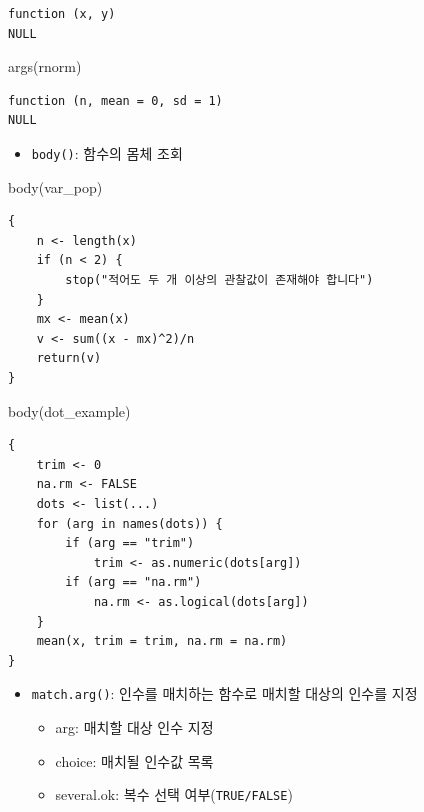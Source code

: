 \documentclass[
  11pt,
]{krantz}
\newenvironment{Shaded}{\begin{snugshade}}{\end{snugshade}}
\newcommand{\FunctionTok}[1]{\textcolor[rgb]{0,0,0}{#1}}
\newcommand{\NormalTok}[1]{#1}
\providecommand{\tightlist}{%
  \setlength{\itemsep}{0pt}\setlength{\parskip}{0pt}}
\begin{document}
\begin{verbatim}
function (x, y) 
NULL
\end{verbatim}

\begin{Shaded}
\begin{Highlighting}[]
\FunctionTok{args}\NormalTok{(rnorm)}
\end{Highlighting}
\end{Shaded}

\begin{verbatim}
function (n, mean = 0, sd = 1) 
NULL
\end{verbatim}

\normalsize

\begin{itemize}
\tightlist
\item
  \texttt{body()}: 함수의 몸체 조회
\end{itemize}

\footnotesize

\begin{Shaded}
\begin{Highlighting}[]
\FunctionTok{body}\NormalTok{(var\_pop)}
\end{Highlighting}
\end{Shaded}

\begin{verbatim}
{
    n <- length(x)
    if (n < 2) {
        stop("적어도 두 개 이상의 관찰값이 존재해야 합니다")
    }
    mx <- mean(x)
    v <- sum((x - mx)^2)/n
    return(v)
}
\end{verbatim}

\begin{Shaded}
\begin{Highlighting}[]
\FunctionTok{body}\NormalTok{(dot\_example)}
\end{Highlighting}
\end{Shaded}

\begin{verbatim}
{
    trim <- 0
    na.rm <- FALSE
    dots <- list(...)
    for (arg in names(dots)) {
        if (arg == "trim") 
            trim <- as.numeric(dots[arg])
        if (arg == "na.rm") 
            na.rm <- as.logical(dots[arg])
    }
    mean(x, trim = trim, na.rm = na.rm)
}
\end{verbatim}

\normalsize

\begin{itemize}
\tightlist
\item
  \texttt{match.arg()}: 인수를 매치하는 함수로 매치할 대상의 인수를 지정

  \begin{itemize}
  \tightlist
  \item
    arg: 매치할 대상 인수 지정
  \item
    choice: 매치될 인수값 목록
  \item
    several.ok: 복수 선택 여부(\texttt{TRUE/FALSE})
  \end{itemize}
\end{itemize}
\end{document}
